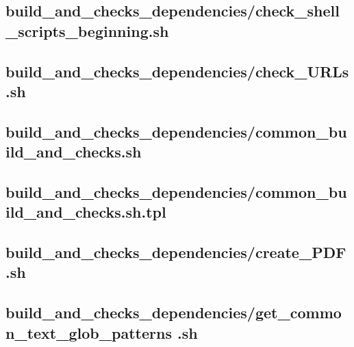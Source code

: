 \documentclass{article}
\begin{document}


\subsection{
  build\_and\_checks\_dependencies/check\_shell\_scripts\_beginning.sh
}
\label{
  build_and_checks_dependencies:check_shell_scripts_beginningsh
}



\subsection{
  build\_and\_checks\_dependencies/check\_URLs.sh
}
\label{
  build_and_checks_dependencies:check_URLssh
}



\subsection{
  build\_and\_checks\_dependencies/common\_build\_and\_checks.sh
}
\label{
  build_and_checks_dependencies:common_build_and_checkssh
}



\subsection{
  build\_and\_checks\_dependencies/common\_build\_and\_checks.sh.tpl
}
\label{
  build_and_checks_dependencies:common_build_and_checksshtpl
}



\subsection{
  build\_and\_checks\_dependencies/create\_PDF.sh
}
\label{
  build_and_checks_dependencies:create_PDFsh
}



\subsection{
  build\_and\_checks\_dependencies/get\_common\_text\_glob\_patterns%
.sh
}
\label{
  build_and_checks_dependencies:get_common_text_glob_patternssh
}
\end{document}
